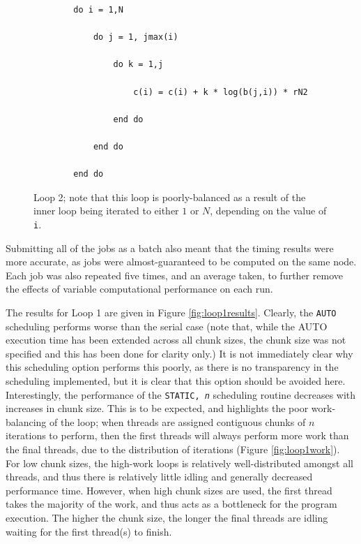 \documentclass{article} %
\newcommand{\tp}{\texttt}
\begin{document}
\begin{figure}
    \begin{lstlisting}
        do i = 1,N

            do j = 1, jmax(i) 
        
                do k = 1,j 
                    
                    c(i) = c(i) + k * log(b(j,i)) * rN2
                
                end do
            
            end do
     
        end do
    \end{lstlisting}
    \caption{Loop 2; note that this loop is poorly-balanced as a result of the inner loop being iterated to either $1$ or $N$, depending on the value of \texttt{i}.}
    \label{listing:loop2}
\end{figure}

Submitting all of the jobs as a batch also meant that the timing results were more accurate, as jobs were almost-guaranteed to be computed on the same node.
Each job was also repeated five times, and an average taken, to further remove the effects of variable computational performance on each run.

The results for Loop 1 are given in Figure \ref{fig:loop1results}. Clearly, the \tp{AUTO} scheduling performs worse than the serial case (note that, while the AUTO execution time has been extended across all chunk sizes, the chunk size was not specified and this has been done for clarity only.)
It is not immediately clear why this scheduling option performs this poorly, as there is no transparency in the scheduling implemented, but it is clear that this option should be avoided here.
Interestingly, the performance of the \tp{STATIC, \textit{n}} scheduling routine decreases with increases in chunk size.
This is to be expected, and highlights the poor work-balancing of the loop; when threads are assigned contiguous chunks of $n$ iterations to perform, then the first threads will always perform more work than the final threads, due to the distribution of iterations (Figure \ref{fig:loop1work}).
For low chunk sizes, the high-work loops is relatively well-distributed amongst all threads, and thus there is relatively little idling and generally decreased performance time.
However, when high chunk sizes are used, the first thread takes the majority of the work, and thus acts as a bottleneck for the program execution. 
The higher the chunk size, the longer the final threads are idling waiting for the first thread(s) to finish.
\end{document}
